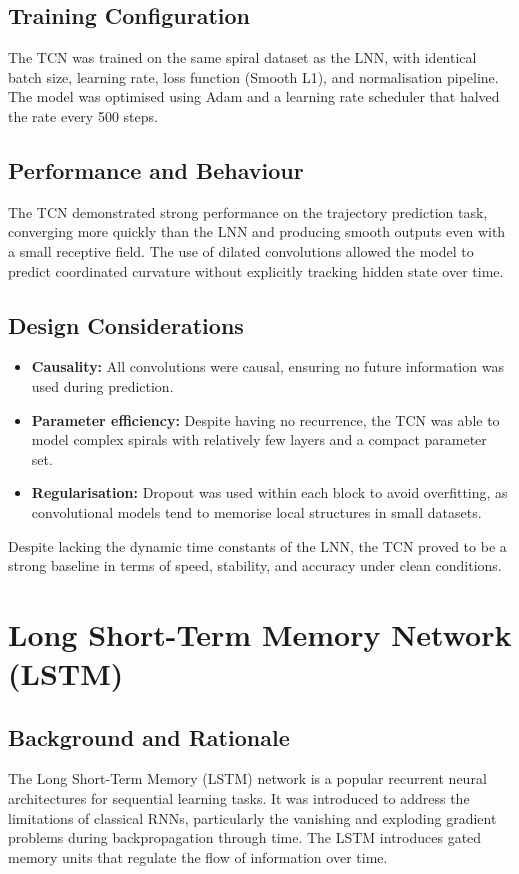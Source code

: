 \subsection{Training Configuration}
The TCN was trained on the same spiral dataset as the LNN, with identical batch size, learning rate, loss function (Smooth L1), and normalisation pipeline. The model was optimised using Adam and a learning rate scheduler that halved the rate every 500 steps.

\subsection{Performance and Behaviour}
The TCN demonstrated strong performance on the trajectory prediction task, converging more quickly than the LNN and producing smooth outputs even with a small receptive field. The use of dilated convolutions allowed the model to predict coordinated curvature without explicitly tracking hidden state over time.

\subsection{Design Considerations}
\begin{itemize}
    \item \textbf{Causality:} All convolutions were causal, ensuring no future information was used during prediction.
    \item \textbf{Parameter efficiency:} Despite having no recurrence, the TCN was able to model complex spirals with relatively few layers and a compact parameter set.
    \item \textbf{Regularisation:} Dropout was used within each block to avoid overfitting, as convolutional models tend to memorise local structures in small datasets.
\end{itemize}

Despite lacking the dynamic time constants of the LNN, the TCN proved to be a strong baseline in terms of speed, stability, and accuracy under clean conditions.


\section{Long Short-Term Memory Network (LSTM)}

\subsection{Background and Rationale}
The Long Short-Term Memory (LSTM) network is a popular recurrent neural architectures for sequential learning tasks. It was introduced to address the limitations of classical RNNs, particularly the vanishing and exploding gradient problems during backpropagation through time. The LSTM introduces gated memory units that regulate the flow of information over time.

